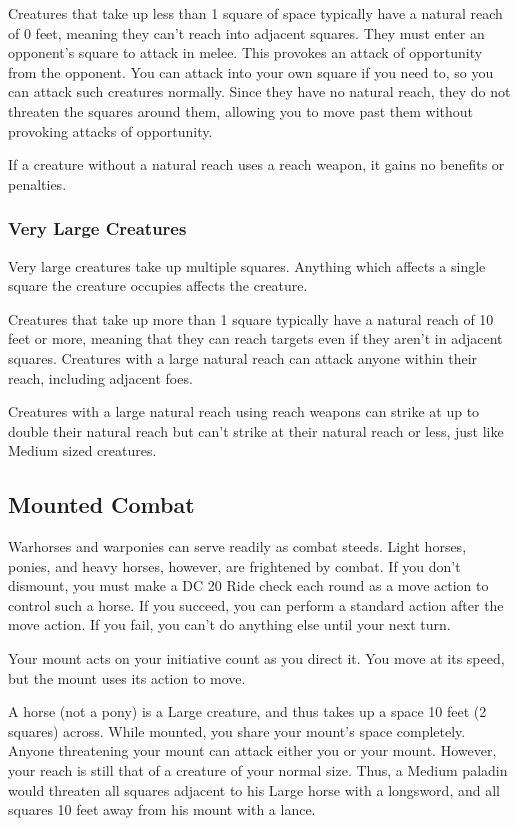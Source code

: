  Creatures that take up less than 1 square of space typically have a natural reach of 0 feet, meaning they can't reach into adjacent squares. They must enter an opponent's square to attack in melee. This provokes an attack of opportunity from the opponent. You can attack into your own square if you need to, so you can attack such creatures normally. Since they have no natural reach, they do not threaten the squares around them, allowing you to move past them without provoking attacks of opportunity.

If a creature without a natural reach uses a reach weapon, it gains no benefits or penalties.

\subsubsection{Very Large Creatures}
 Very large creatures take up multiple squares. Anything which affects a single square the creature occupies affects the creature. 

 Creatures that take up more than 1 square typically have a natural reach of 10 feet or more, meaning that they can reach targets even if they aren't in adjacent squares. Creatures with a large natural reach can attack anyone within their reach, including adjacent foes.

Creatures with a large natural reach using reach weapons can strike at up to double their natural reach but can't strike at their natural reach or less, just like Medium sized creatures.

\subsection{Mounted Combat}\label{Mounted Combat}
 Warhorses and warponies can serve readily as combat steeds. Light horses, ponies, and heavy horses, however, are frightened by combat. If you don't dismount, you must make a DC 20 Ride check each round as a move action to control such a horse. If you succeed, you can perform a standard action after the move action. If you fail, you can't do anything else until your next turn.

Your mount acts on your initiative count as you direct it. You move at its speed, but the mount uses its action to move.

 A horse (not a pony) is a Large creature, and thus takes up a space 10 feet (2 squares) across. While mounted, you share your mount's space completely. Anyone threatening your mount can attack either you or your mount. However, your reach is still that of a creature of your normal size. Thus, a Medium paladin would threaten all squares adjacent to his Large horse with a longsword, and all squares 10 feet away from his mount with a lance.

